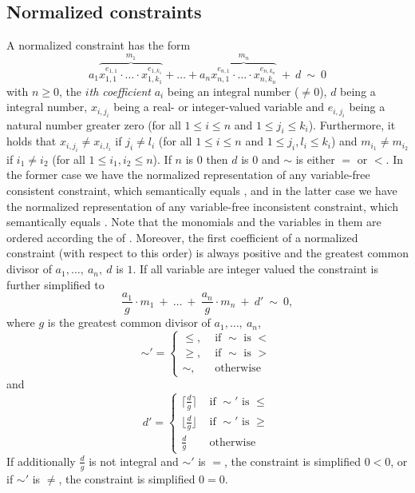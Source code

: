 \subsection{Normalized constraints}
A normalized constraint has the form
\[a_1\overbrace{x_{1,1}^{e_{1,1}}\cdot\ldots\cdot x_{1,k_1}^{e_{1,k_1}}}^{m_1}+\ldots+a_n\overbrace{x_{n,1}^{e_{n,1}}\cdot\ldots\cdot x_{n,k_n}^{e_{n,k_n}}}^{m_n}\ + \ d\ \sim \ 0\]
with $n\geq0$, the \emph{$i$th coefficient} $a_i$ being an integral number ($\neq 0$), $d$ being a integral number, $x_{i,j_i}$ being a real- or integer-valued variable and $e_{i,j_i}$ being a natural number greater zero (for all $1\leq i\leq n$ and $1\leq j_i\leq k_i$). Furthermore, it holds that
$x_{i,j_i}\neq x_{i,l_i}$ if $j_i\neq l_i$ (for all $1\leq i\leq n$ and $1\leq j_i, l_i\leq k_i$) and $m_{i_1}\neq m_{i_2}$ if $i_1\neq i_2$ (for all $1\leq i_1,i_2\leq n$). If $n$ is $0$ then $d$ is $0$ and $\sim$ is either $=$ or $<$. In the former case we have the normalized representation of any variable-free consistent constraint, which semantically equals \true, and in the latter case we have the normalized representation of any variable-free inconsistent constraint, which semantically equals \false. Note that the monomials and the variables in them are ordered according the \polynomialOrder of \carl.
Moreover, the first coefficient of a normalized constraint (with respect to this order) is always positive and the greatest common divisor of $a_1,\ldots,\ a_n,\ d$ is $1$. If all variable are integer valued the constraint is further simplified to
\[\frac{a_1}{g}\cdot m_1\ +\ \ldots\ +\ \frac{a_n}{g}\cdot m_n\ + \ d'\  \sim \ 0,\]
where $g$ is the greatest common divisor of $a_1,\ldots,\ a_n$, 
\[\sim'=\left\{
\begin{array}{ll}
\leq, &\text{ if }\sim\text{ is }< \\
\geq, &\text{ if }\sim\text{ is }> \\
\sim, &\text{ otherwise }
\end{array}
\right.\]
and
\[
d' = \left\{
\begin{array}{ll}
\lceil\frac{d}{g}\rceil &\text{ if }\sim'\text{ is }\leq \\[1.5ex]
\lfloor\frac{d}{g}\rfloor &\text{ if }\sim'\text{ is }\geq \\[1.5ex]
\frac{d}{g} &\text{ otherwise }
\end{array}
\right.\]
If additionally $\frac{d}{g}$ is not integral and $\sim'$ is $=$, the constraint is simplified $0<0$, or if $\sim'$ is $\neq$,
the constraint is simplified $0=0$.

